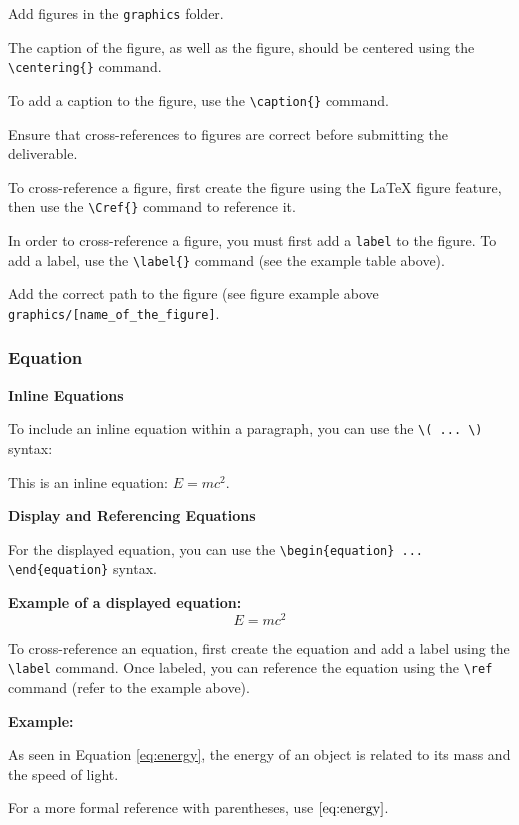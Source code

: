 Add figures in the \texttt{graphics} folder.

The caption of the figure, as well as the figure, should be centered using the \texttt{\textbackslash centering\{\}} command.

To add a caption to the figure, use the \texttt{\textbackslash caption\{\}} command. 

Ensure that cross-references to figures are correct before submitting the deliverable. 

To cross-reference a figure, first create the figure using the LaTeX figure feature, then use the \texttt{\textbackslash Cref\{\}} command to reference it.

In order to cross-reference a figure, you must first add a \texttt{label} to the figure. To add a label, use the \texttt{\textbackslash label\{\}} command (see the example table above).

Add the correct path to the figure (see figure example above  \texttt{graphics/[name\_of\_the\_figure]}.


\subsubsection{Equation}
\label{sec:equation}

\textbf{Inline Equations}

To include an inline equation within a paragraph, you can use the \verb|\( ... \)| syntax:

This is an inline equation: \( E = mc^2 \).

\textbf{Display and Referencing Equations}

For the displayed equation, you can use the 
\texttt{\textbackslash begin\{equation\} ... \textbackslash end\{equation\}} syntax.

\textbf{Example of a displayed equation:}
\begin{equation}
E = mc^2 \label{eq:energy}
\end{equation}


To cross-reference an equation, first create the equation and add a label using the \texttt{\textbackslash label{}} command. Once labeled, you can reference the equation using the \texttt{\textbackslash ref{}} command (refer to the example above).

\textbf{Example:}

As seen in Equation \ref{eq:energy}, the energy of an object is related to its mass and the speed of light.

For a more formal reference with parentheses, use \(\eqref{eq:energy}\).


